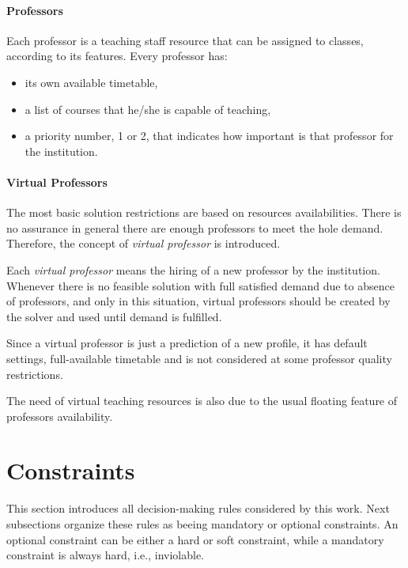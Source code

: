 \paragraph{Professors}
\label{defprof}

Each professor is a teaching staff resource that can be assigned to classes, according to its features. Every professor has:
\begin{itemize}
\item its own available timetable,
\item a list of courses that he/she is capable of teaching,
\item a priority number, 1 or 2, that indicates how important is that professor for the institution.
\end{itemize}




\paragraph{Virtual Professors}
\label{defpv}

The most basic solution restrictions are based on resources availabilities. There is no assurance in general there are enough professors to meet the hole demand. Therefore, the concept of \textit{virtual professor} is introduced.

Each \textit{virtual professor} means the hiring of a new professor by the institution. Whenever there is no feasible solution with full satisfied demand due to absence of professors, and only in this situation, virtual professors should be created by the solver and used until demand is fulfilled.

Since a virtual professor is just a prediction of a new profile, it has default settings, full-available timetable and is not considered at some professor quality restrictions.

The need of virtual teaching resources is also due to the usual floating feature of professors availability.



\pagebreak

\section{Constraints}
\label{sec:allconstr}

This section introduces all decision-making rules considered by this work. Next subsections organize these rules as beeing mandatory or optional constraints. An optional constraint can be either a hard or soft constraint, while a mandatory constraint is always hard, i.e., inviolable.


